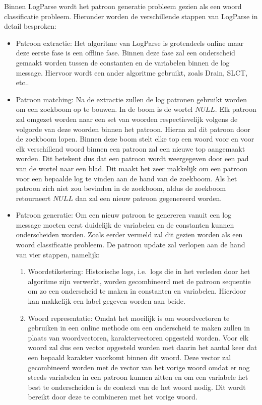 Binnen LogParse wordt het patroon generatie probleem gezien als een woord classificatie probleem. Hieronder worden de verschillende stappen van LogParse in detail besproken:
\begin{itemize}
    \item Patroon extractie: Het algoritme van LogParse is grotendeels online maar deze eerste fase is een offline fase. Binnen deze fase zal een onderscheid gemaakt worden tussen de constanten en de variabelen binnen de log message. Hiervoor wordt een ander algoritme gebruikt, zoals Drain, SLCT, etc..\\
     
    \item Patroon matching: Na de extractie zullen de log patronen gebruikt worden om een zoekboom op te bouwen. In de boom is de wortel $NULL$. Elk patroon zal omgezet worden naar een set van woorden respectievelijk volgens de volgorde van deze woorden binnen het patroon. Hierna zal dit patroon door de zoekboom lopen. Binnen deze boom stelt elke top een woord voor en voor elk verschillend woord binnen een patroon zal een nieuwe top aangemaakt worden. Dit betekent dus dat een patroon wordt weergegeven door een pad van de wortel naar een blad. Dit maakt het zeer makkelijk om een patroon voor een bepaalde log te vinden aan de hand van de zoekboom. Als het patroon zich niet zou bevinden in de zoekboom, aldus de zoekboom retourneert $NULL$ dan zal een nieuw patroon gegenereerd worden.\\
    
    \item Patroon generatie: Om een nieuw patroon te genereren vanuit een log message moeten eerst duidelijk de variabelen en de constanten kunnen onderscheiden worden. Zoals eerder vermeld zal dit gezien worden als een woord classificatie probleem. De patroon update zal verlopen aan de hand van vier stappen, namelijk:
    \begin{enumerate}
        \item Woordetiketering: Historische logs, i.e.\ logs die in het verleden door het algoritme zijn verwerkt, worden gecombineerd met de patroon sequentie om zo een onderscheid te maken in constanten en variabelen. Hierdoor kan makkelijk een label gegeven worden aan beide.\\
        
        \item Woord representatie: Omdat het moeilijk is om woordvectoren te gebruiken in een online methode om een onderscheid te maken zullen in plaats van woordvectoren, karaktervectoren opgesteld worden. Voor elk woord zal dus een vector opgesteld worden met daarin het aantal keer dat een bepaald karakter voorkomt binnen dit woord. Deze vector zal gecombineerd worden met de vector van het vorige woord omdat er nog steeds variabelen in een patroon kunnen zitten en om een variabele het best te onderscheiden is de context van de het woord nodig. Dit wordt bereikt door deze te combineren met het vorige woord.\\
        

\end{enumerate}
\end{itemize}
